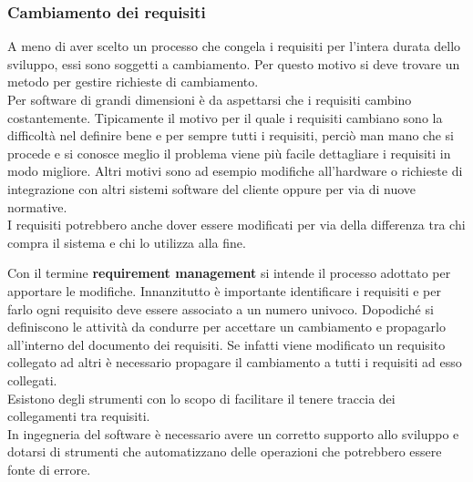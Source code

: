 \subsubsection{Cambiamento dei requisiti}
A meno di aver scelto un processo che congela i requisiti per l'intera durata dello sviluppo, essi sono soggetti a cambiamento.
Per questo motivo si deve trovare un metodo per gestire richieste di cambiamento.\\
Per software di grandi dimensioni è da aspettarsi che i requisiti cambino costantemente.
Tipicamente il motivo per il quale i requisiti cambiano sono la difficoltà nel definire bene e per sempre tutti i requisiti, perciò man mano che si procede e si conosce meglio il problema viene più facile dettagliare i requisiti in modo migliore.
Altri motivi sono ad esempio modifiche all'hardware o richieste di integrazione con altri sistemi software del cliente oppure per via di nuove normative.\\
I requisiti potrebbero anche dover essere modificati per via della differenza tra chi compra il sistema e chi lo utilizza alla fine.

Con il termine \textbf{requirement management} si intende il processo adottato per apportare le modifiche.
Innanzitutto è importante identificare i requisiti e per farlo ogni requisito deve essere associato a un numero univoco.
Dopodiché si definiscono le attività da condurre per accettare un cambiamento e propagarlo all'interno del documento dei requisiti.
Se infatti viene modificato un requisito collegato ad altri è necessario propagare il cambiamento a tutti i requisiti ad esso collegati.\\
Esistono degli strumenti con lo scopo di facilitare il tenere traccia dei collegamenti tra requisiti.\\
In ingegneria del software è necessario avere un corretto supporto allo sviluppo e dotarsi di strumenti che automatizzano delle operazioni che potrebbero essere fonte di errore.
